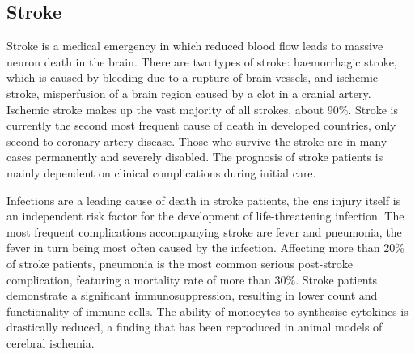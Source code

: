 
\subsection{Stroke} \label{sec:intro:stroke}
Stroke is a medical emergency in which reduced blood flow leads to massive neuron death in the brain. There are two types of stroke: haemorrhagic stroke, which is caused by bleeding due to a rupture of brain vessels, and ischemic stroke, misperfusion of a brain region caused by a clot in a cranial artery. Ischemic stroke makes up the vast majority of all strokes, about 90\%.\cite{} Stroke is currently the second most frequent cause of death in developed countries, only second to coronary artery disease.\cite{} Those who survive the stroke are in many cases permanently and severely disabled. The prognosis of stroke patients is mainly dependent on clinical complications during initial care.

Infections are a leading cause of death in stroke patients, the \ac{cns} injury itself is an independent risk factor for the development of life-threatening infection. The most frequent complications accompanying stroke are fever and pneumonia, the fever in turn being most often caused by the infection. Affecting more than 20\% of stroke patients, pneumonia is the most common serious post-stroke complication, featuring a mortality rate of more than 30\%.\cite{Meisel2005} Stroke patients demonstrate a significant immunosuppression, resulting in lower count and functionality of immune cells. The ability of monocytes to synthesise cytokines is drastically reduced, a finding that has been reproduced in animal models of cerebral ischemia.

